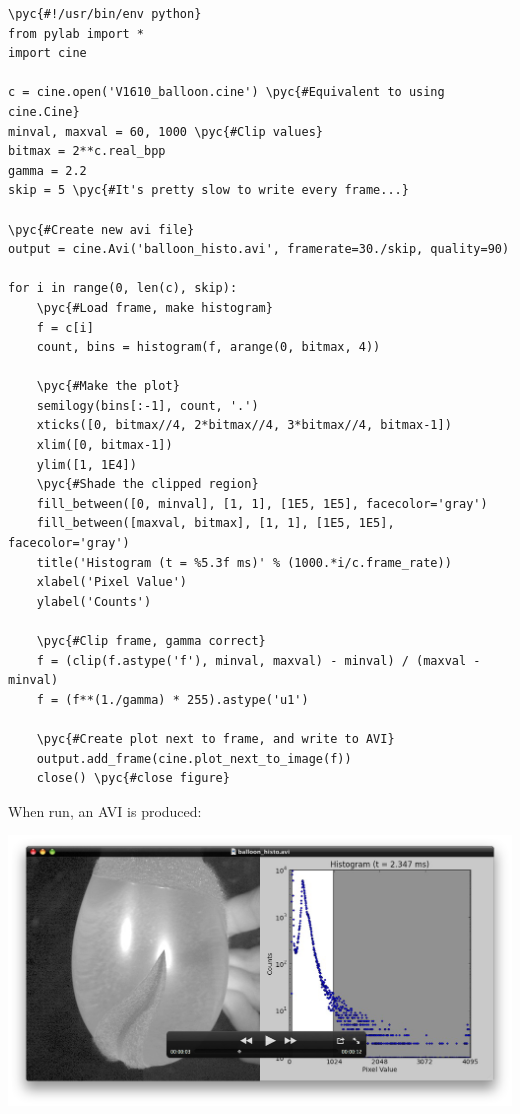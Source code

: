 \documentclass[11pt]{amsart}
\newcommand{\pyc}[1]{\textcolor{comment_color}{#1}}
\begin{document}
\begin{Verbatim}[frame=lines, label=example2.py, labelposition=topline, commandchars=\\\{\}]
\pyc{#!/usr/bin/env python}
from pylab import *
import cine

c = cine.open('V1610_balloon.cine') \pyc{#Equivalent to using cine.Cine}
minval, maxval = 60, 1000 \pyc{#Clip values}
bitmax = 2**c.real_bpp
gamma = 2.2
skip = 5 \pyc{#It's pretty slow to write every frame...}

\pyc{#Create new avi file}
output = cine.Avi('balloon_histo.avi', framerate=30./skip, quality=90)

for i in range(0, len(c), skip):
    \pyc{#Load frame, make histogram}
    f = c[i]
    count, bins = histogram(f, arange(0, bitmax, 4))
    
    \pyc{#Make the plot}
    semilogy(bins[:-1], count, '.')
    xticks([0, bitmax//4, 2*bitmax//4, 3*bitmax//4, bitmax-1])
    xlim([0, bitmax-1])
    ylim([1, 1E4])
    \pyc{#Shade the clipped region}
    fill_between([0, minval], [1, 1], [1E5, 1E5], facecolor='gray')
    fill_between([maxval, bitmax], [1, 1], [1E5, 1E5], facecolor='gray')
    title('Histogram (t = %5.3f ms)' % (1000.*i/c.frame_rate))
    xlabel('Pixel Value')
    ylabel('Counts')

    \pyc{#Clip frame, gamma correct}
    f = (clip(f.astype('f'), minval, maxval) - minval) / (maxval - minval)
    f = (f**(1./gamma) * 255).astype('u1')

    \pyc{#Create plot next to frame, and write to AVI}
    output.add_frame(cine.plot_next_to_image(f))
    close() \pyc{#close figure}

\end{Verbatim}

When run, an AVI is produced: 

\includegraphics[width=6in]{figures/example2.png}
\end{document}
